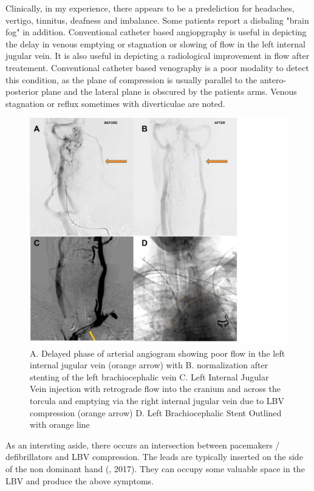\documentclass{article}
\begin{document}
Clinically, in my experience, there appears to be a predeliction for headaches, vertigo, tinnitus, deafness and imbalance.
Some patients report a disbaling "brain fog" in addition.
Conventional catheter based angiopgraphy is useful in depicting the delay in venous emptying or stagnation or slowing of flow in the left internal jugular vein.
It is also useful in depicting a radiological improvement in flow after treatement.
Conventional catheter based venography is a poor modality to detect this condition, as the plane of compression is usually parallel to the antero-posterior plane and the lateral plane is obscured by the patients arms.
Venous stagnation or reflux sometimes with diverticulae are noted.

\begin{figure}[htbp]
\centering
\includegraphics[width=.9\linewidth]{./images/LBVprocedure.jpg}
\caption{A. Delayed phase of arterial angiogram showing poor flow in the left internal jugular vein (orange arrow) with B. normalization after stenting of the left brachiocephalic vein C. Left Internal Jugular Vein injection with retrograde flow into the cranium and across the torcula and emptying via the right internal jugular vein due to LBV compression (orange arrow) D. Left Brachiocephalic Stent Outlined with orange line}
\end{figure}

As an intersting aside, there occurs an intersection between pacemakers / defibrillators and LBV compression.
The leads are typically inserted on the side of the non dominant hand (, 2017).
They can occupy some valuable space in the LBV and produce the above symptoms.
\end{document}
